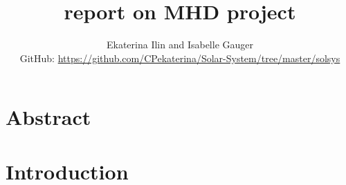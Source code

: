 \documentclass[11pt,a4wide]{article}
\begin{document}
\title{report on MHD project}
\author{Ekaterina Ilin and Isabelle Gauger\\GitHub: \url{https://github.com/CPekaterina/Solar-System/tree/master/solsys}
}
\maketitle
\tableofcontents
\newpage

\section{Abstract}
\section{Introduction}


%
%
\end{document}
